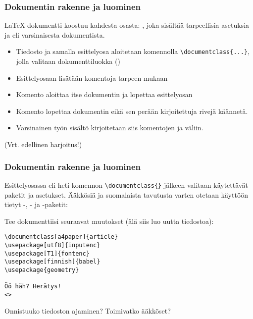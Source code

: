 \begin{fframe}
    \frametitle{Dokumentin rakenne ja luominen}
    \LaTeX-dokumentti koostuu kahdesta osasta: , joka sisältää tarpeellisia asetuksia ja  eli varsinaisesta dokumentista.
    \pause
    \begin{itemize}[<+->]
        \item Tiedosto ja samalla esittelyosa aloitetaan komennolla \lstinline+\documentclass{...}+, jolla valitaan dokumenttiluokka ()
        \item Esittelyosaan lisätään komentoja tarpeen mukaan
        \item Komento \lstinline++ aloittaa itse dokumentin ja lopettaa esittelyosan
        \item Komento \lstinline++  lopettaa dokumentin eikä sen perään kirjoitettuja rivejä käännetä.
        \item Varsinainen työn sisältö kirjoitetaan siis komentojen \lstinline++  ja  \lstinline++  väliin.
    \end{itemize}
    (Vrt. edellinen harjoitus!)
\end{fframe}

\begin{fframe}
    \frametitle{Dokumentin rakenne ja luominen}
    Esittelyosassa eli heti komennon \lstinline+\documentclass{}+  jälkeen valitaan käytettävät paketit ja asetukset. \pause Ääkkösiä ja suomalaista tavutusta varten otetaan käyttöön tietyt -, - ja -paketit:\pause
    \begin{harj}
        Tee dokumenttiisi seuraavat muutokset (älä siis luo uutta tiedostoa):
        \begin{lstlisting}
\documentclass[a4paper]{article}
\usepackage[utf8]{inputenc}
\usepackage[T1]{fontenc}
\usepackage[finnish]{babel}
\usepackage{geometry}

Öö häh? Herätys!
<>
        \end{lstlisting}
    Onnistuuko tiedoston ajaminen? Toimivatko ääkköset?
    \end{harj}
\end{fframe}

